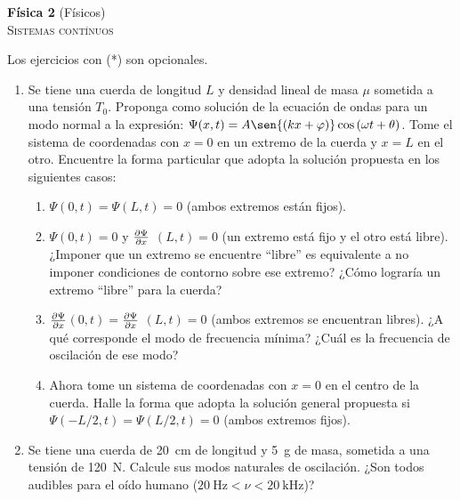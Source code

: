 \documentclass[11pt,spanish,a4paper]{article}
\begin{document}
\begin{center}
\textbf{Física 2} (Físicos) \hfill {}\\
	\textsc{\LARGE Sistemas contínuos}
\end{center}

Los ejercicios con (*) son opcionales.

\begin{enumerate}


\subsection*{Cuerda}

\item Se tiene una cuerda de longitud $L$ y densidad lineal de masa $\mu$ sometida a una tensión $T_{0}$.
Proponga como solución de la ecuación de ondas para un modo normal a la expresión: $\Psi(x,t)= A \sen{ \left(k x+ \varphi \right ) } \cos{ \left( \omega t + \theta \right) }$.
Tome el sistema de coordenadas con $x=0$ en un extremo de la cuerda y $x=L$ en el otro.
Encuentre la forma particular que adopta la solución propuesta en los siguientes casos: 
\begin{enumerate}
	\item $\Psi(0,t) = \Psi(L,t) = 0$ (ambos extremos están fijos). 
	\item $\Psi(0,t) = 0$ y $\pdv{\Psi}{x}$ $(L,t)= 0$ (un extremo está fijo y el otro está libre).
	¿Imponer que un extremo se encuentre ``libre'' es equivalente a no imponer condiciones de contorno sobre ese extremo?
	¿Cómo lograría un extremo ``libre'' para la cuerda? 
	\item $\pdv{\Psi}{x}$$(0,t)=$$ \pdv{\Psi}{x}$ $(L,t)= 0$ (ambos extremos se encuentran libres).
	¿A qué corresponde el modo de frecuencia mínima?
	¿Cuál es la frecuencia de oscilación de ese modo? 
	\item Ahora tome un sistema de coordenadas con $x=0$ en el centro de la cuerda.
	Halle la forma que adopta la solución general propuesta si $\Psi(-L/2,t)= \Psi(L/2,t)= 0$ (ambos extremos fijos).
\end{enumerate}


\item Se tiene una cuerda de \SI{20}{\centi\metre} de longitud y \SI{5}{\gram} de masa, sometida a una tensión de \SI{120}{\newton}.
Calcule sus modos naturales de oscilación.
¿Son todos audibles para el oído humano (\(\SI{20}{\hertz} < \nu < \SI{20}{\kilo\hertz}\))?



\end{enumerate}
\end{document}
